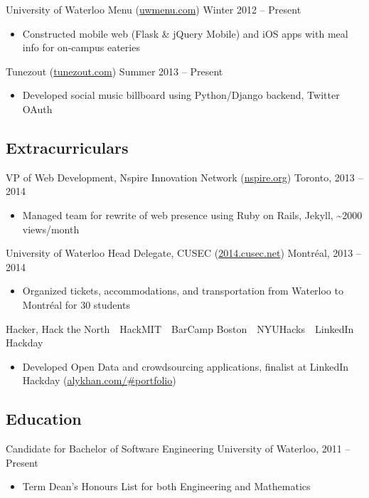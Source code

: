 \documentclass[pdftex,11pt,letterpaper]{article}
\begin{document}
University of Waterloo Menu (\href{http://uwmenu.com}{uwmenu.com}) \hfill {\color{gray} Winter 2012 -- Present}
\begin{itemize}
  \item Constructed mobile web (Flask \& jQuery Mobile) and iOS apps with meal info for on-campus eateries
\end{itemize}

Tunezout (\href{http://tunezout.com}{tunezout.com}) \hfill {\color{gray} Summer 2013 -- Present}
\begin{itemize}
  \item Developed social music billboard using Python/Django backend, Twitter OAuth
\end{itemize}

\subsection*{Extracurriculars}

VP of Web Development, Nspire Innovation Network (\href{http://nspire.org}{nspire.org}) \hfill {\color{gray} Toronto, 2013 -- 2014}
\begin{itemize}
  \item Managed team for rewrite of web presence using Ruby on Rails, Jekyll, \textasciitilde2000 views/month
\end{itemize}

University of Waterloo Head Delegate, CUSEC (\href{http://2014.cusec.net}{2014.cusec.net}) \hfill {\color{gray} Montr\'{e}al, 2013 -- 2014}
\begin{itemize}
  \item Organized tickets, accommodations, and transportation from Waterloo to Montr\'{e}al for 30 students
\end{itemize}

Hacker, Hack the North\ \textperiodcentered\ HackMIT\ \textperiodcentered\ BarCamp Boston\ \textperiodcentered\ NYUHacks\ \textperiodcentered\ LinkedIn Hackday
\begin{itemize}
  \item Developed Open Data and crowdsourcing applications, finalist at LinkedIn Hackday (\href{http://alykhan.com/\#portfolio}{alykhan.com/\#portfolio})
\end{itemize}

\subsection*{Education}

Candidate for Bachelor of Software Engineering \hfill {\color{gray} University of Waterloo, 2011 -- Present}
\begin{itemize}
  \item Term Dean's Honours List for both Engineering and Mathematics
\end{itemize}
\end{document}
